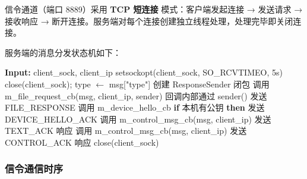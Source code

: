 \documentclass[12pt]{article}
\begin{document}
信令通道（端口 8889）采用 \textbf{TCP 短连接} 模式：客户端发起连接 → 发送请求 → 接收响应 → 断开连接。服务端对每个连接创建独立线程处理，处理完毕即关闭连接。

服务端的消息分发状态机如下：

\begin{algorithm}[H]
\caption{SignalingServer 消息分发}
\begin{algorithmic}[1]
\State \textbf{Input:} client\_sock, client\_ip
\State setsockopt(client\_sock, SO\_RCVTIMEO, 5s)
    \State close(client\_sock); \Return
\EndIf
\State type $\gets$ msg["type"]
    \State 创建 ResponseSender 闭包
    \State 调用 m\_file\_request\_cb(msg, client\_ip, sender)
    \State 回调内部通过 sender() 发送 FILE\_RESPONSE
    \State 调用 m\_device\_hello\_cb 
    \State \textbf{if} 本机有公钥 \textbf{then} 发送 DEVICE\_HELLO\_ACK
    \State 调用 m\_control\_msg\_cb(msg, client\_ip)
    \State 发送 TEXT\_ACK 响应
    \State 调用 m\_control\_msg\_cb(msg, client\_ip)
    \State 发送 CONTROL\_ACK 响应
\EndIf
\State close(client\_sock)
\end{algorithmic}
\end{algorithm}

\subsubsection{信令通信时序}
\end{document}
